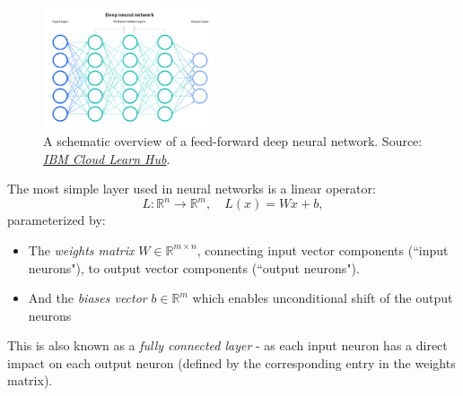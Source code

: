 \documentclass{article}
\begin{document}
\begin{figure}
    \centering
    \vspace{-3mm}
    \includegraphics[width=0.45\textwidth]{figures/mlp_overview.png}
    \caption{
        A schematic overview of a feed-forward deep neural network. Source: \href{https://www.ibm.com/uk-en/cloud/learn/neural-networks}{\emph{IBM Cloud Learn Hub}}.
    }
    \label{fig:mlp_overview}
    \vspace{-12mm}
\end{figure}

\medskip
\noindent
The most simple layer used in neural networks is a linear operator:
\begin{equation*}
    L: \mathbb{R}^n \rightarrow \mathbb{R}^m , \quad L(x) = Wx + b,
\end{equation*}
parameterized by:
\begin{itemize}
    \item
        The \emph{weights matrix} $W \in \mathbb{R}^{m \times n}$, connecting input vector components (``input neurons"), to output vector components (``output neurons").
    \item
        And the \emph{biases vector} $b \in \mathbb{R}^m$ which enables unconditional shift of the output neurons
\end{itemize}
This is also known as a \emph{fully connected layer} - as each input neuron has a direct impact on each output neuron (defined by the corresponding entry in the weights matrix).
\end{document}
